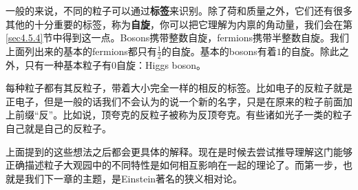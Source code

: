 一般的来说，不同的粒子可以通过{\bf 标签}来识别。除了荷和质量之外，它们还有很多其他的十分重要的标签，称为{\bf 自旋}，你可以把它理解为内禀的角动量，我们会在第\ref{sec4.5.4}节中得到这一点。Bosons携带整数自旋，fermions携带半整数自旋。我们上面列出来的基本的fermions都只有$\tfrac{1}{2}$的自旋。基本的bosons有着$1$的自旋。除此之外，只有一种基本粒子有$0$自旋：Higgs boson。

每种粒子都有其反粒子，带着大小完全一样的相反的标签。比如电子的反粒子就是正电子，但是一般的话我们不会认为的说一个新的名字，只是在原来的粒子前面加上前缀``反''。比如说，顶夸克的反粒子被称为反顶夸克。有些诸如光子一类的粒子自己就是自己的反粒子。

上面提到的这些想法之后都会更具体的解释。现在是时候去尝试推导理解这门能够正确描述粒子大观园中的不同特性是如何相互影响在一起的理论了。而第一步，也就是我们下一章的主题，是Einstein著名的狭义相对论。



